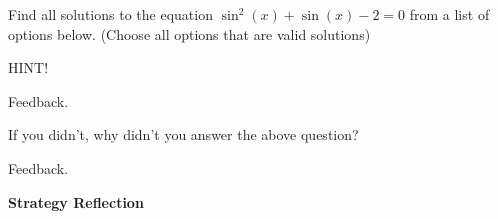 \documentclass{ximera}
\begin{document}
\begin{problem} 

\begin{problem}
    Find all solutions to the equation $\sin^2(x) + \sin(x) -2 = 0$ from a list of options below.  (Choose all options that are valid solutions)
    
    \begin{hint}
    HINT!
    \end{hint}

  \begin{selectAll}
      
      \begin{feedback}[attempt]
      Feedback.
      \end{feedback}
      
  \end{selectAll}
  
\end{problem}

\begin{question}
  
  If you didn't, why didn't you answer the above question?
  
  \begin{multipleChoice}
      
      \begin{feedback}[attempt]
      Feedback.
      \end{feedback}
  \end{multipleChoice}
  
\end{question}
  
\end{problem}


\begin{center} \textbf{Strategy Reflection}\end{center}
\end{document}

